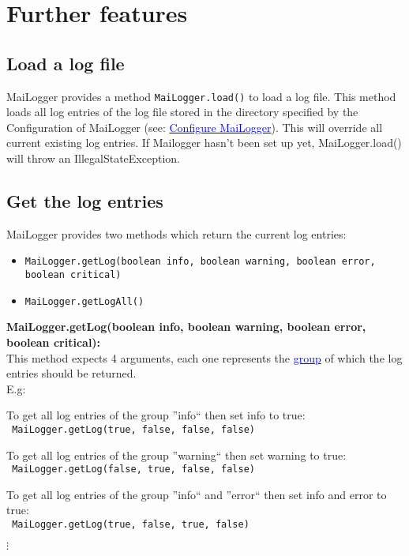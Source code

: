 \documentclass{article}
\newcommand{\refh}[2]{\hyperref[#1] {\textcolor{blue}{#2}}}
\newcommand{\tab}[1][1]{\hspace*{#1cm}}
\begin{document}
\section{Further features}
\label{other}
    \subsection{Load a log file}
    \label{other_load}
    MaiLogger provides a method \lstinline|MaiLogger.load()| to load a log file.
    This method loads all log entries of the log file stored in the directory specified by the Configuration of MaiLogger (see: \refh{setup_mailogger.setup}{Configure MaiLogger}).
    This will override all current existing log entries.
    If Mailogger hasn't been set up yet, MaiLogger.load() will throw an IllegalStateException.

    \subsection{Get the log entries}
    \label{other_getlog}
    MaiLogger provides two methods which return the current log entries:
    \begin{itemize}
        \item \lstinline|MaiLogger.getLog(boolean info, boolean warning, boolean error, boolean critical)|
        \item \lstinline|MaiLogger.getLogAll()|
    \end{itemize}

    \textbf{MaiLogger.getLog(boolean info, boolean warning, boolean error, boolean critical):} \\
    This method expects 4 arguments, each one represents the \refh{logging_groups}{group} of which the log entries should be returned. \\
    E.g: \\
    \begin{description}
        \item To get all log entries of the group ''info`` then set info to true: \\ \lstinline| MaiLogger.getLog(true, false, false, false)|
        \item To get all log entries of the group ''warning`` then set warning to true: \\ \lstinline| MaiLogger.getLog(false, true, false, false)|
        \item To get all log entries of the group ''info`` and ''error`` then set info and error to true: \\ \lstinline| MaiLogger.getLog(true, false, true, false)|
        \item \tab[5] $\vdots$
    \end{description}
\end{document}
